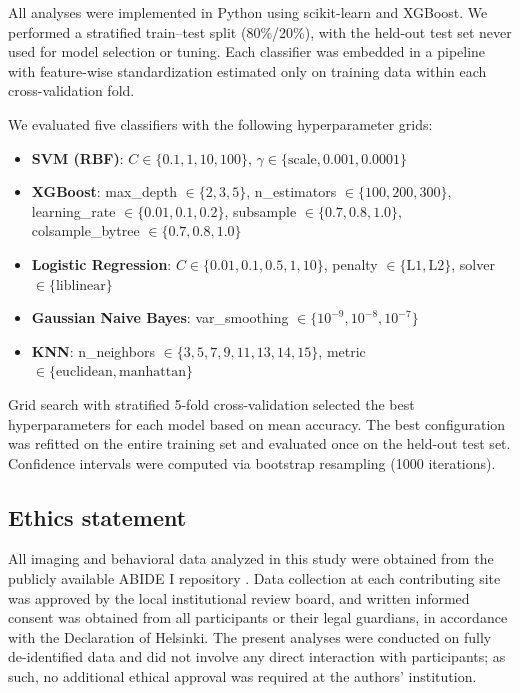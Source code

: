 \documentclass[10pt,letterpaper]{article}
\begin{document}
All analyses were implemented in Python using scikit-learn and XGBoost. We performed a stratified
train--test split (80\%/20\%), with the held-out test set never used for model selection or tuning.
Each classifier was embedded in a pipeline with feature-wise standardization estimated only on
training data within each cross-validation fold.

We evaluated five classifiers with the following hyperparameter grids:
\begin{itemize}
    \item \textbf{SVM (RBF)}: $C \in \{0.1, 1, 10, 100\}$, $\gamma \in \{\text{scale}, 0.001, 0.0001\}$
    \item \textbf{XGBoost}: max\_depth $\in \{2, 3, 5\}$, n\_estimators $\in \{100, 200, 300\}$, learning\_rate $\in \{0.01, 0.1, 0.2\}$, subsample $\in \{0.7, 0.8, 1.0\}$, colsample\_bytree $\in \{0.7, 0.8, 1.0\}$
    \item \textbf{Logistic Regression}: $C \in \{0.01, 0.1, 0.5, 1, 10\}$, penalty $\in \{\mathrm{L1}, \mathrm{L2}\}$, solver $\in \{\mathrm{liblinear}\}$
    \item \textbf{Gaussian Naive Bayes}: var\_smoothing $\in \{10^{-9}, 10^{-8}, 10^{-7}\}$
    \item \textbf{KNN}: n\_neighbors $\in \{3, 5, 7, 9, 11, 13, 14, 15\}$, metric $\in \{\mathrm{euclidean}, \mathrm{manhattan}\}$
\end{itemize}

Grid search with stratified 5-fold cross-validation selected the best hyperparameters for each
model based on mean accuracy. The best configuration was refitted on the entire training set and
evaluated once on the held-out test set. Confidence intervals were computed via bootstrap
resampling (1000 iterations).

\subsection*{Ethics statement}

All imaging and behavioral data analyzed in this study were obtained from the publicly available
ABIDE I repository \cite{DiMartino:2014abide}. Data collection at each contributing site was
approved by the local institutional review board, and written informed consent was obtained from
all participants or their legal guardians, in accordance with the Declaration of Helsinki. The
present analyses were conducted on fully de-identified data and did not involve any direct
interaction with participants; as such, no additional ethical approval was required at the authors'
institution.
\end{document}
